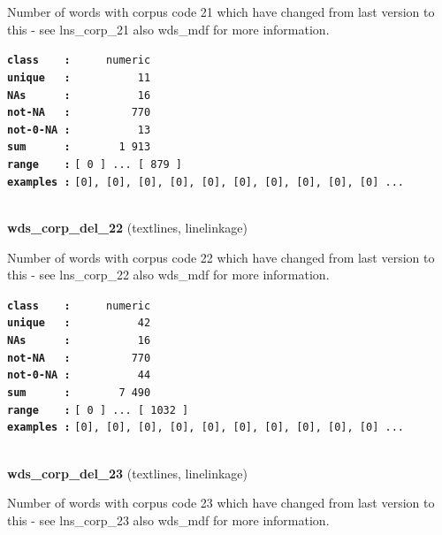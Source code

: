 \documentclass[]{article}
\begin{document}
Number of words with corpus code 21 which have changed from last version
to this - see lns\_corp\_21 also wds\_mdf for more information.

\textbf{\texttt{class\ \ \ \ :}} \texttt{~~~~~numeric}\\
\textbf{\texttt{unique\ \ \ :}} \texttt{~~~~~~~~~~11}\\
\textbf{\texttt{NAs\ \ \ \ \ \ :}} \texttt{~~~~~~~~~~16}\\
\textbf{\texttt{not-NA\ \ \ :}} \texttt{~~~~~~~~~770}\\
\textbf{\texttt{not-0-NA\ :}} \texttt{~~~~~~~~~~13}\\
\textbf{\texttt{sum\ \ \ \ \ \ :}} \texttt{~~~~~~~1~913}\\
\textbf{\texttt{range\ \ \ \ :}}
\texttt{{[}\ 0\ {]}\ ...\ {[}\ 879\ {]}}\\
\textbf{\texttt{examples\ :}}
\texttt{{[}0{]},\ {[}0{]},\ {[}0{]},\ {[}0{]},\ {[}0{]},\ {[}0{]},\ {[}0{]},\ {[}0{]},\ {[}0{]},\ {[}0{]}\ ...}\\

~

\textbf{wds\_corp\_del\_22} (textlines, linelinkage)

Number of words with corpus code 22 which have changed from last version
to this - see lns\_corp\_22 also wds\_mdf for more information.

\textbf{\texttt{class\ \ \ \ :}} \texttt{~~~~~numeric}\\
\textbf{\texttt{unique\ \ \ :}} \texttt{~~~~~~~~~~42}\\
\textbf{\texttt{NAs\ \ \ \ \ \ :}} \texttt{~~~~~~~~~~16}\\
\textbf{\texttt{not-NA\ \ \ :}} \texttt{~~~~~~~~~770}\\
\textbf{\texttt{not-0-NA\ :}} \texttt{~~~~~~~~~~44}\\
\textbf{\texttt{sum\ \ \ \ \ \ :}} \texttt{~~~~~~~7~490}\\
\textbf{\texttt{range\ \ \ \ :}}
\texttt{{[}\ 0\ {]}\ ...\ {[}\ 1032\ {]}}\\
\textbf{\texttt{examples\ :}}
\texttt{{[}0{]},\ {[}0{]},\ {[}0{]},\ {[}0{]},\ {[}0{]},\ {[}0{]},\ {[}0{]},\ {[}0{]},\ {[}0{]},\ {[}0{]}\ ...}\\

~

\textbf{wds\_corp\_del\_23} (textlines, linelinkage)

Number of words with corpus code 23 which have changed from last version
to this - see lns\_corp\_23 also wds\_mdf for more information.
\end{document}
